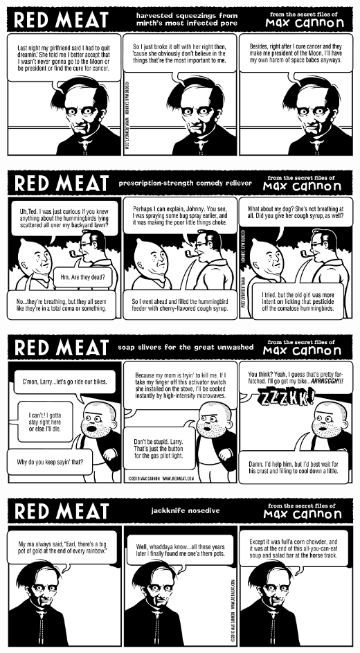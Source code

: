\documentclass[a4paper,twoside,11pt]{article}
\begin{document}
\includegraphics[width=\textwidth]{redmeat_2010-06-29.png}



\includegraphics[width=\textwidth]{redmeat_2010-07-06.png}



\includegraphics[width=\textwidth]{redmeat_2010-07-13.png}



\includegraphics[width=\textwidth]{redmeat_2010-07-20.png}
\end{document}

